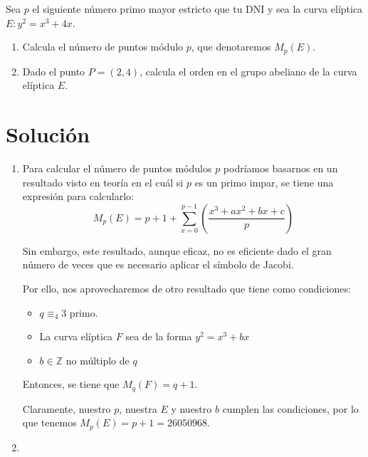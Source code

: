 	Sea $p$ el siguiente número primo mayor estricto que tu DNI y sea la curva elíptica $E: y^2 = x^3 + 4x$.
	\begin{enumerate}
		\item Calcula el número de puntos módulo $p$, que denotaremos $M_p(E)$.
		\item Dado el punto $P = (2,4)$, calcula el orden en el grupo abeliano de la curva elíptica $E$.
	\end{enumerate}
	
\section*{Solución}
	\begin{enumerate}
		\item Para calcular el número de puntos módulos $p$ podríamos basarnos en un resultado visto en teoría
		en el cuál si $p$ es un primo impar, se tiene una expresión para calcularlo:
		$$\displaystyle M_p(E) = p + 1 + \sum_{x=0}^{p-1} \left( \frac{x^3 + ax^2 + bx + c}{p} \right)$$
		
		Sin embargo, este resultado, aunque eficaz, no es eficiente dado el gran número de veces que es necesario
		aplicar el símbolo de Jacobi.
		
		Por ello, nos aprovecharemos de otro resultado que tiene como condiciones:
		\begin{itemize}
			\item $q \equiv_4 3$ primo.
			\item La curva elíptica $F$ sea de la forma $y^2 = x^3 + bx$
			\item $b \in \mathbb{Z}$ no múltiplo de $q$
		\end{itemize}
		Entonces, se tiene que $M_q(F) = q+1$.

		Claramente, nuestro $p$, nuestra $E$ y nuestro $b$ cumplen las condiciones, por lo que tenemos $M_p(E)
		= p+1 = 26050968$.
		
		\item 
	\end{enumerate}